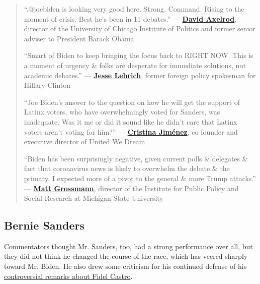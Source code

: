 \begin{quote}
``.@joebiden is looking very good here. Strong. Command. Rising to the
moment of crisis. Best he's been in 11 debates.'' ---
\textbf{\href{https://twitter.com/davidaxelrod/status/1239347201995874309}{David
Axelrod}}, director of the University of Chicago Institute of Politics
and former senior adviser to President Barack Obama

``Smart of Biden to keep bringing the focus back to RIGHT NOW. This is a
moment of urgency \& folks are desperate for immediate solutions, not
academic debates.'' ---
\textbf{\href{https://twitter.com/JesseLehrich/status/1239348905965498369}{Jesse
Lehrich}}, former foreign policy spokesman for Hillary Clinton

``Joe Biden's answer to the question on how he will get the support of
Latinx voters, who have overwhelmingly voted for Sanders, was
inadequate. Was it me or did it sound like he didn't care that Latinx
voters aren't voting for him?'' ---
\textbf{\href{https://twitter.com/CrisAlexJimenez/status/1239372196092489730}{Cristina
Jiménez}}, co-founder and executive director of United We Dream

``Biden has been surprisingly negative, given current polls \& delegates
\& fact that coronavirus news is likely to overwhelm the debate \& the
primary. I expected more of a pivot to the general \& more Trump
attacks.'' ---
\textbf{\href{https://twitter.com/MattGrossmann/status/1239362292283826176}{Matt
Grossmann}}, director of the Institute for Public Policy and Social
Research at Michigan State University
\end{quote}

\hypertarget{bernie-sanders}{%
\subsection{Bernie Sanders}\label{bernie-sanders}}

Commentators thought Mr. Sanders, too, had a strong performance over
all, but they did not think he changed the course of the race, which has
veered sharply toward Mr. Biden. He also drew some criticism for his
continued defense of his
\href{https://www.nytimes.com/2020/02/24/us/bernie-sanders-fidel-castro-florida.html}{controversial
remarks about Fidel Castro}.

